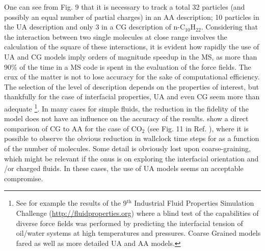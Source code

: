 \documentclass[9pt,bestpractices]{livecoms}
\begin{document}
One can see from Fig. 9 that it is necessary to track a total 32 particles (and possibly
an equal number of partial charges) in an AA description; 10 particles in the
UA description and only 3 in a CG description of n-C$_{10}$H$_{22}$.
Considering that the interaction between two single molecules at close range
involves the calculation of the square of these interactions, it is evident how
rapidly the use of UA and CG models imply orders of magnitude speedup in
the MS, as more than 90\% of the time in a MS code is spent in the evaluation
of the force fields. The crux of the matter is not to lose accuracy for the
sake of computational efficiency. The selection of the level of description
depends on the properties of interest, but thankfully for the case of
interfacial properties, UA and even CG seem more than adequate
\footnote{See for example the results of the 9$^{\mathrm{th}}$
Industrial Fluid Properties Simulation Challenge
(\url{http://fluidproperties.org}) where a blind test of the capabilities of
diverse force fields was performed by predicting the interfacial tension of
oil/water systems at high temperatures and pressures. Coarse Grained models
\citet{herdes2018} fared as well as more detailed UA and AA models\citet{chen2018}.}.
In many cases for
simple fluids, the reduction in the fidelity of the model does not have an
influence on the accuracy of the results. 
\citet{avendano2011} show a direct comparison of CG to AA for the case of
CO$_{2}$ (see Fig. 11 in Ref. \citep{avendano2011}), where it is possible
to observe the obvious reduction in wallclock time steps for as a function of
the number of molecules. Some detail is obviously lost upon coarse-graining,
which might be relevant if the onus is on exploring the interfacial orientation
and /or charged fluids. In these cases, the use of UA models seems an
acceptable compromise. 
\end{document}
